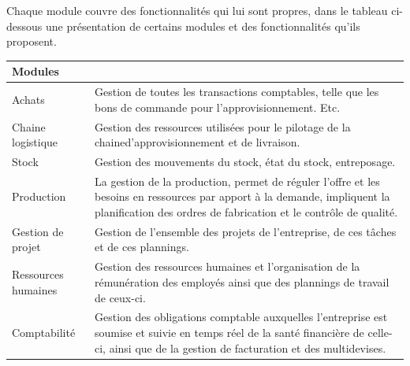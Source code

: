 Chaque module couvre des fonctionnalités qui lui sont propres, dans le tableau ci-dessous une présentation de certains modules et des fonctionnalités qu’ils proposent.

\begin{table}[H]
    \begin{center}
        
        \begin{tabular}{|F{4cm}|R{10cm}|}
            \hline
            \textbf{Modules}  &  \\
            \hline
            Achats
            &
            Gestion de toutes les transactions comptables, telle que les bons de commande pour l’approvisionnement. Etc.\\
            
            \hline
            Chaine logistique
            &
            Gestion des ressources utilisées pour le pilotage de la chained’approvisionnement et de livraison.\\
            
            \hline
            Stock
            &
            Gestion des mouvements du stock, état du stock, entreposage.\\
            
            \hline
            Production
            &
            La gestion de la production, permet de réguler l’offre et les besoins en
            ressources par apport à la demande, impliquent la planification des ordres
            de fabrication et le contrôle de qualité.\\
            
            \hline
            Gestion de projet
            &
            Gestion de l’ensemble des projets de l’entreprise, de ces tâches et de ces plannings.\\
            
            \hline
            Ressources humaines
            &
            Gestion des ressources humaines et l’organisation de la rémunération des employés ainsi que des plannings de travail de ceux-ci.\\
            
            
            \hline
            Comptabilité
            &
            Gestion des obligations comptable auxquelles l’entreprise est soumise et suivie en temps réel de la santé financière de celle-ci, ainsi que de la gestion de facturation et des multidevises.\\
            

\end{tabular}
\end{center}
\end{table}
